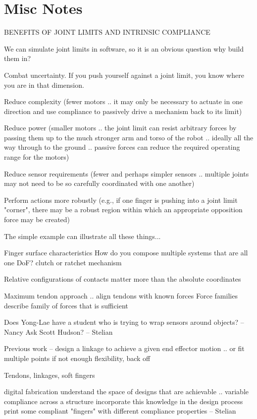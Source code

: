 \section{Misc Notes}


BENEFITS OF JOINT LIMITS AND INTRINSIC COMPLIANCE

We can simulate joint limits in software, so it is an obvious question why build them in?

Combat uncertainty.   If you push yourself against a joint limit, you know where you are in that dimension.

Reduce complexity (fewer motors .. it may only be necessary to actuate in one direction and use compliance to passively drive a mechanism back to its limit)

Reduce power (smaller motors .. the joint limit can resist arbitrary forces by passing them up to the much stronger arm and torso of the robot  ..  ideally all the way through to the ground .. passive forces can reduce the required operating range for the motors)

Reduce sensor requirements (fewer and perhaps simpler sensors .. multiple joints may not need to be so carefully coordinated with one another)

Perform actions more robustly (e.g., if one finger is pushing into a joint limit "corner", there may be a robust region within which an appropriate opposition force may be created)

The simple example can illustrate all these things...




Finger surface characteristics
How do you compose multiple systems that are all one DoF?
  clutch or ratchet mechanism

Relative configurations of contacts matter more than the absolute coordinates

Maximum tendon approach .. align tendons with known forces
Force families describe family of forces that is sufficient

Does Yong-Lae have a student who is trying to wrap sensors around objects? -- Nancy
Ask Scott Hudson? -- Stelian

Previous work -- design a linkage to achieve a given end effector motion .. or fit multiple points
if not enough flexibility, back off 

Tendons, linkages, soft fingers

digital fabrication
   understand the space of designs that are achievable .. variable compliance across a structure
   incorporate this knowledge in the design process
   print some compliant "fingers" with different compliance properties -- Stelian

